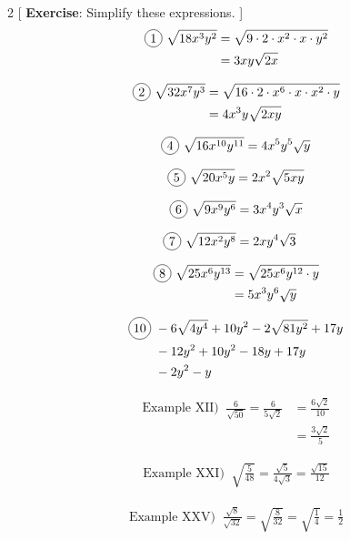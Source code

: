 \begin{multicols}{2}
[
  \textbf{Exercise}: Simplify these expressions.
]
\begin{align*}
  \circled{1}\ \sqrt{18x^{3}y^{2}}&= \sqrt{9 \cdot 2 \cdot x^{2} \cdot x \cdot y^{2}} \\
  &=3xy\sqrt{2x}
\end{align*}


\begin{align*}
  \circled{2}\ \sqrt{32x^{7}y^{3}}&=\sqrt{16\cdot 2 \cdot x^{6} \cdot x\cdot x^{2}\cdot y}\\
  &=4x^{3}y\sqrt{2xy}
\end{align*}

\begin{align*}
  \circled{4}\ \sqrt{16x^{10}y^{11}}=4x^{5}y^{5}\sqrt{y}
\end{align*}

\begin{align*}
  \circled{5}\ \sqrt{20x^{5}y}=2x^{2}\sqrt{5xy}
\end{align*}

\begin{align*}
  \circled{6}\ \sqrt{9x^{9}y^{6}}=3x^{4}y^{3}\sqrt{x}
\end{align*}

\begin{align*}
  \circled{7}\ \sqrt{12x^{2}y^{8}}&=2xy^{4}\sqrt{3}
\end{align*}

\begin{align*}
  \circled{8}\ \sqrt{25x^{6}y^{13}}&=\sqrt{25x^{6}y^{12}\cdot y}\\
  &=5x^{3}y^{6}\sqrt{y}
\end{align*}

\begin{align*}
  \circled{10}\ &-6\sqrt{4y^{4}}+10y^{2}-2\sqrt{81y^{2}}+17y\\
  &-12y^{2}+10y^{2}-18y+17y\\
  &-2y^{2}-y
\end{align*}

\begin{align*}
  \text{Example XII) }\ \frac{6}{\sqrt{50}}=\frac{6}{5\sqrt{2}}&=\frac{6\sqrt{2}}{10}\\
  &=\frac{3\sqrt{2}}{5}
\end{align*}

\begin{align*}
  \text{Example XXI) }\ \sqrt{\frac{5}{48}}=\frac{\sqrt{5}}{4\sqrt{3}}=\frac{\sqrt{15}}{12}
\end{align*}

\begin{align*}
  \text{Example XXV) }\ \frac{\sqrt{8}}{\sqrt{32}}=\sqrt{\frac{8}{32}}=\sqrt{\frac{1}{4}}=\frac{1}{2}
\end{align*}

\end{multicols}

